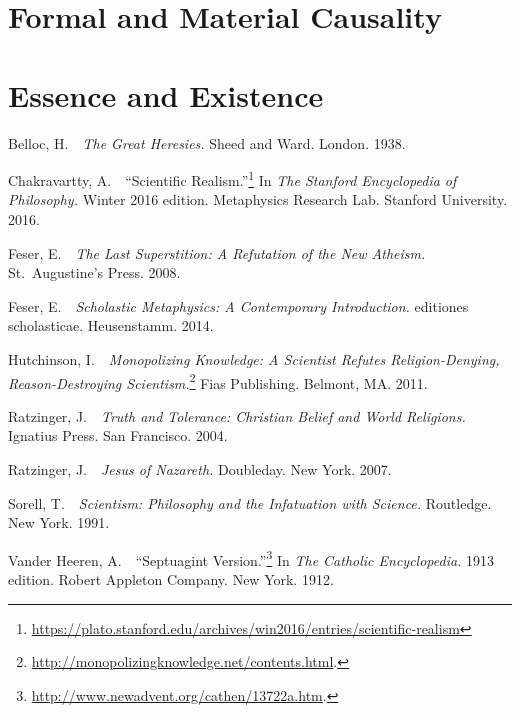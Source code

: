\documentclass[twocolumn]{article}
\begin{document}
\section{Formal and Material Causality}

\section{Essence and Existence}



\begin{thebibliography}{}

   \begin{small}

      Belloc, H.\ \ {\it The Great Heresies.}  Sheed and Ward.  London.  1938.

      Chakravartty, A.\ \ ``Scientific Realism.''\footnote{%
         \url{https://plato.stanford.edu/archives/win2016/entries/scientific-realism}%
      }
      In {\it The Stanford Encyclopedia of Philosophy.}  Winter 2016 edition.
      Metaphysics Research Lab.  Stanford University.  2016.

      Feser, E.\ \ {\it The Last Superstition: A Refutation of the New
      Atheism.}  St.~Augustine's Press.  2008.

      Feser, E.\ \ {\it Scholastic Metaphysics: A Contemporary Introduction.}
      editiones scholasticae.  Heusenstamm.  2014.

      Hutchinson, I.\ \ {\it Monopolizing Knowledge: A Scientist Refutes
      Religion-Denying, Reason-Destroying Scientism.}\footnote{%
         \url{http://monopolizingknowledge.net/contents.html}.%
      }
      Fias Publishing.  Belmont, MA.  2011.

      Ratzinger, J.\ \ {\it Truth and Tolerance: Christian Belief and World
      Religions.}  Ignatius Press.  San Francisco.  2004.

      Ratzinger, J.\ \ {\it Jesus of Nazareth.}  Doubleday.  New York.  2007.

      Sorell, T.\ \ {\it Scientism: Philosophy and the Infatuation with
      Science.}  Routledge.  New York.  1991.

      Vander Heeren, A.\ \ ``Septuagint Version.''\footnote{%
         \url{http://www.newadvent.org/cathen/13722a.htm}.%
      }
      In {\it The Catholic Encyclopedia.}  1913 edition.  Robert Appleton
      Company.  New York.  1912.

   \end{small}

\end{thebibliography}

\newpage


\end{document}
